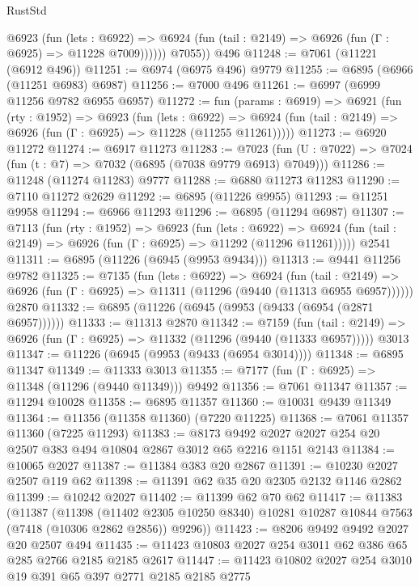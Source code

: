 \begin{lexlean}{RustStd}
\begin{coremodule}
            @6923
              (fun (lets : @6922) =>
              @6924 (fun (tail : @2149) => @6926 (fun (Γ : @6925) => @11228 @7009))))))
        @7055))
    @496
@11248 := @7061 (@11221 (@6912 @496))
@11251 := @6974 (@6975 @496) @9779
@11255 := @6895 (@6966 (@11251 @6983) @6987)
@11256 := @7000 @496
@11261 := @6997 (@6999 @11256 @9782 @6955 @6957)
@11272 := fun (params : @6919) =>
  @6921
    (fun (rty : @1952) =>
    @6923
      (fun (lets : @6922) =>
      @6924 (fun (tail : @2149) => @6926 (fun (Γ : @6925) => @11228 (@11255 @11261)))))
@11273 := @6920 @11272
@11274 := @6917 @11273
@11283 := @7023 (fun (U : @7022) => @7024 (fun (t : @7) => @7032 (@6895 (@7038 @9779 @6913) @7049)))
@11286 := @11248 (@11274 @11283) @9777
@11288 := @6880 @11273 @11283
@11290 := @7110 @11272 @2629
@11292 := @6895 (@11226 @9955)
@11293 := @11251 @9958
@11294 := @6966 @11293
@11296 := @6895 (@11294 @6987)
@11307 := @7113
    (fun (rty : @1952) =>
    @6923
      (fun (lets : @6922) =>
      @6924 (fun (tail : @2149) => @6926 (fun (Γ : @6925) => @11292 (@11296 @11261)))))
    @2541
@11311 := @6895 (@11226 (@6945 (@9953 @9434)))
@11313 := @9441 @11256 @9782
@11325 := @7135
    (fun (lets : @6922) =>
    @6924
      (fun (tail : @2149) =>
      @6926 (fun (Γ : @6925) => @11311 (@11296 (@9440 (@11313 @6955 @6957))))))
    @2870
@11332 := @6895 (@11226 (@6945 (@9953 (@9433 (@6954 (@2871 @6957))))))
@11333 := @11313 @2870
@11342 := @7159
    (fun (tail : @2149) => @6926 (fun (Γ : @6925) => @11332 (@11296 (@9440 (@11333 @6957)))))
    @3013
@11347 := @11226 (@6945 (@9953 (@9433 (@6954 @3014))))
@11348 := @6895 @11347
@11349 := @11333 @3013
@11355 := @7177 (fun (Γ : @6925) => @11348 (@11296 (@9440 @11349))) @9492
@11356 := @7061 @11347
@11357 := @11294 @10028
@11358 := @6895 @11357
@11360 := @10031 @9439 @11349
@11364 := @11356 (@11358 @11360) (@7220 @11225)
@11368 := @7061 @11357 @11360 (@7225 @11293)
@11383 := @8173 @9492 @2027 @2027 @254 @20 @2507 @383 @494 @10804 @2867 @3012 @65 @2216 @1151 @2143
@11384 := @10065 @2027
@11387 := @11384 @383 @20 @2867
@11391 := @10230 @2027 @2507 @119 @62
@11398 := @11391 @62 @35 @20 @2305 @2132 @1146 @2862
@11399 := @10242 @2027
@11402 := @11399 @62 @70 @62
@11417 := @11383
    (@11387
      (@11398
        (@11402 @2305 @10250 @8340)
        @10281
        @10287
        @10844
        @7563
        (@7418 (@10306 @2862 @2856))
        @9296))
@11423 := @8206 @9492 @9492 @2027 @20 @2507 @494
@11435 := @11423 @10803 @2027 @254 @3011 @62 @386 @65 @285 @2766 @2185 @2185 @2617
@11447 := @11423 @10802 @2027 @254 @3010 @19 @391 @65 @397 @2771 @2185 @2185 @2775

\end{coremodule}
\end{lexlean}
